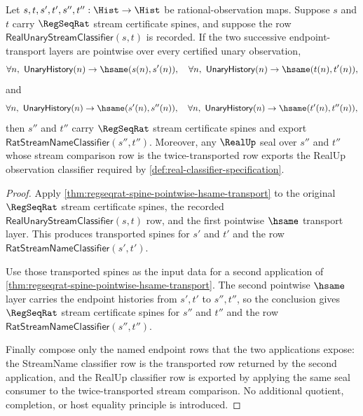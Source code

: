 \begin{theorem}
\label{thm:regseqrat-stream-classifier-transport-composition}
Let $s,t,s',t',s'',t'':\Hist\to\Hist$ be rational-observation maps. Suppose
$s$ and $t$ carry $\RegSeqRat$ stream certificate spines, and suppose the row
$\mathsf{RealUnaryStreamClassifier}(s,t)$ is recorded. If the two successive
endpoint-transport layers are pointwise over every certified unary observation,
$$
\forall n,\ \mathsf{UnaryHistory}(n)\to\hsame(s(n),s'(n)),
\quad
\forall n,\ \mathsf{UnaryHistory}(n)\to\hsame(t(n),t'(n)),
$$
and
$$
\forall n,\ \mathsf{UnaryHistory}(n)\to\hsame(s'(n),s''(n)),
\quad
\forall n,\ \mathsf{UnaryHistory}(n)\to\hsame(t'(n),t''(n)),
$$
then $s''$ and $t''$ carry $\RegSeqRat$ stream certificate spines and export
$\mathsf{RatStreamNameClassifier}(s'',t'')$. Moreover, any $\RealUp$ seal over
$s''$ and $t''$ whose stream comparison row is the twice-transported row
exports the RealUp observation classifier required by
\autoref{def:real-classifier-specification}.
\end{theorem}
\begin{proof}
Apply \autoref{thm:regseqrat-spine-pointwise-hsame-transport} to the original
$\RegSeqRat$ stream certificate spines, the recorded
$\mathsf{RealUnaryStreamClassifier}(s,t)$ row, and the first pointwise
$\hsame$ transport layer. This produces transported spines for $s'$ and $t'$
and the row $\mathsf{RatStreamNameClassifier}(s',t')$.

Use those transported spines as the input data for a second application of
\autoref{thm:regseqrat-spine-pointwise-hsame-transport}. The second pointwise
$\hsame$ layer carries the endpoint histories from $s',t'$ to $s'',t''$, so
the conclusion gives $\RegSeqRat$ stream certificate spines for $s''$ and
$t''$ and the row $\mathsf{RatStreamNameClassifier}(s'',t'')$.

Finally compose only the named endpoint rows that the two applications expose:
the StreamName classifier row is the transported row returned by the second
application, and the RealUp classifier row is exported by applying the same
seal consumer to the twice-transported stream comparison. No additional
quotient, completion, or host equality principle is introduced.
\end{proof}

